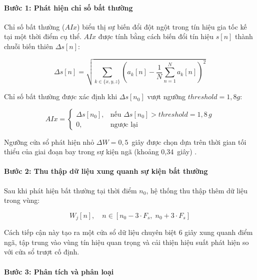 \paragraph{Bước 1: Phát hiện chỉ số bất thường}

Chỉ số bất thường ($AIx$) biểu thị sự biến đổi đột ngột trong tín hiệu gia tốc kế tại một thời điểm cụ thể. $AIx$ được tính bằng cách biến đổi tín hiệu $s[n]$ thành chuỗi biến thiên $\Delta s[n]$:

\begin{equation}
\Delta s[n] = \sqrt{\sum_{k \in \{x, y, z\}} \left( a_k[n] - \frac{1}{N} \sum_{n=1}^{N} a_k[n] \right)^2}
\label{eq:delta_s}
\end{equation}

Chỉ số bất thường được xác định khi $\Delta s[n_0]$ vượt ngưỡng $threshold = 1{,}8g$:

\begin{equation}
AIx = \begin{cases}
\Delta s[n_0], & \text{nếu } \Delta s[n_0] > threshold = 1{,}8\,g \\
0, & \text{ngược lại}
\end{cases}
\label{eq:AIx}
\end{equation}

Ngưỡng cửa sổ phát hiện nhỏ $\Delta W = 0{,}5$~giây được chọn dựa trên thời gian tối thiểu của giai đoạn bay trong sự kiện ngã (khoảng 0,34~giây) \cite{Elder_Falling_2019}.

\paragraph{Bước 2: Thu thập dữ liệu xung quanh sự kiện bất thường}

Sau khi phát hiện bất thường tại thời điểm $n_0$, hệ thống thu thập thêm dữ liệu trong vùng:

\begin{equation}
W_j[n], \quad n \in [n_0 - 3 \cdot F_s, \; n_0 + 3 \cdot F_s]
\end{equation}

Cách tiếp cận này tạo ra một cửa sổ dữ liệu chuyên biệt 6 giây xung quanh điểm ngã, tập trung vào vùng tín hiệu quan trọng và cải thiện hiệu suất phát hiện so với cửa sổ trượt cố định.

\paragraph{Bước 3: Phân tích và phân loại}

